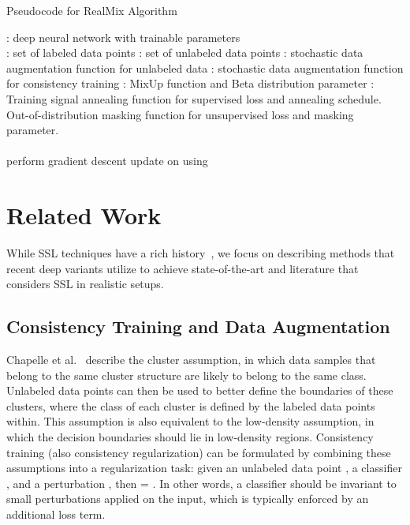 \documentclass[10pt,twocolumn,letterpaper]{article}
\begin{document}
\newcommand{\req}{\algorithmicrequire\hspace*{0.5em}}
\newcommand{\tab}{\hspace*{3mm}}
\newcommand{\tabb}{\tab\tab}

\begin{algorithm*}[t!]
\caption{Pseudocode for RealMix Algorithm}
\label{alg:realmix}
\begin{algorithmic}[1]
\STATE \req : deep neural network with trainable parameters \\
\STATE \req : set of labeled data points
\STATE \req : set of unlabeled data points
\STATE \req : stochastic data augmentation function for unlabeled data
\STATE \req : stochastic data augmentation function for consistency training
\STATE \req : MixUp function and Beta distribution parameter
\STATE \req : Training signal annealing function for supervised loss and annealing schedule.
\STATE \req  Out-of-distribution masking function for unsupervised loss and masking parameter.
\STATE 
{}
\STATE 
\STATE  
\ENDFOR
\STATE 
\STATE 
\STATE \label{line:mixuplabeled}\\
\STATE \label{line:mixupunlabeled}\\
\STATE 
\IF{}
\STATE 
\ENDIF
\STATE 
\STATE 
\STATE 
\STATE 
\STATE perform gradient descent update on  using 
\ENDFOR
\RETURN 
\end{algorithmic}
\end{algorithm*}

\section{Related Work}
\label{relatedwork}

While SSL techniques have a rich history~\cite{introsslChapelle, clusterChapelle, sslZhu}, we focus on describing methods that recent deep variants utilize to achieve  state-of-the-art and literature that considers SSL in realistic setups.

\subsection{Consistency Training and Data Augmentation}

Chapelle et al.~\cite{introsslChapelle, clusterChapelle} describe the cluster assumption, in which data samples that belong to the same cluster structure are likely to belong to the same class. Unlabeled data points can then be used to better define the boundaries of these clusters, where the class of each cluster is defined by the labeled data points within. This assumption is also equivalent to the low-density assumption, in which the decision boundaries should lie in low-density regions. Consistency training (also consistency regularization) can be formulated by combining these assumptions into a regularization task: given an unlabeled data point , a classifier , and a perturbation , then  = . In other words, a classifier should be invariant to small perturbations applied on the input, which is typically enforced by an additional loss term.
\end{document}
